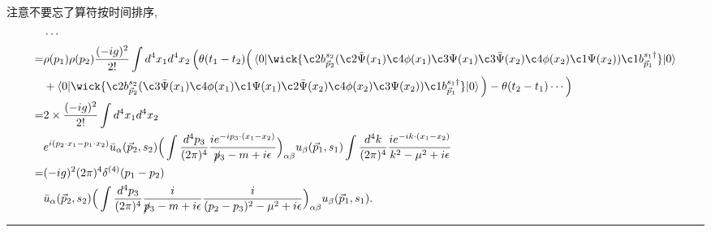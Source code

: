 \begin{itemize}
	\begin{tcolorbox}[title=calculation:]
		注意不要忘了算符按时间排序,
		\begin{align}
			& \cdots \notag \\
			=& \rho(p_1) \rho(p_2) \frac{(- i g)^2}{2!} \int d^4 x_1 d^4 x_2 \, \Big( \theta(t_1 - t_2) \Big( \braket{0 | \wick{
				\c2 b^{s_2}_{\vec{p}_2} (\c2 {\bar{\Psi}}(x_1) \c4 \phi(x_1) \c3 \Psi(x_1) \c3 {\bar{\Psi}}(x_2) \c4 \phi(x_2) \c1 \Psi(x_2)) \c1 b^{s_1 \dag}_{\vec{p}_1}
			} | 0} \notag \\
			& + \braket{0 | \wick{
				\c2 b^{s_2}_{\vec{p}_2} (\c3 {\bar{\Psi}}(x_1) \c4 \phi(x_1) \c1 \Psi(x_1) \c2 {\bar{\Psi}}(x_2) \c4 \phi(x_2) \c3 \Psi(x_2)) \c1 b^{s_1 \dag}_{\vec{p}_1}
			} | 0} \Big) - \theta(t_2 - t_1) \cdots \Big) \notag \\
			=& 2 \times \frac{(- i g)^2}{2!} \int d^4 x_1 d^4 x_2 \notag \\
			& e^{i (p_2 \cdot x_1 - p_1 \cdot x_2)} \bar{u}_\alpha(\vec{p}_2, s_2) \Big( \int \frac{d^4 p_3}{(2 \pi)^4} \frac{i e^{- i p_3 \cdot (x_1 - x_2)}}{\cancel{p}_3 - m + i \epsilon} \Big)_{\alpha \beta} u_\beta(\vec{p}_1, s_1) \int \frac{d^4 k}{(2 \pi)^4} \frac{i e^{- i k \cdot (x_1 - x_2)}}{k^2 - \mu^2 + i \epsilon} \notag \\
			=& (- i g)^2 (2 \pi)^4 \delta^{(4)}(p_1 - p_2) \notag \\
			& \bar{u}_\alpha(\vec{p}_2, s_2) \Big( \int \frac{d^4 p_3}{(2 \pi)^4} \frac{i}{\cancel{p}_3 - m + i \epsilon} \frac{i}{(p_2 - p_3)^2 - \mu^2 + i \epsilon} \Big)_{\alpha \beta} u_\beta(\vec{p}_1, s_1).
		\end{align}
	\end{tcolorbox}
	
	\noindent\rule[0.5ex]{\linewidth}{0.5pt} %
	

\end{itemize}
